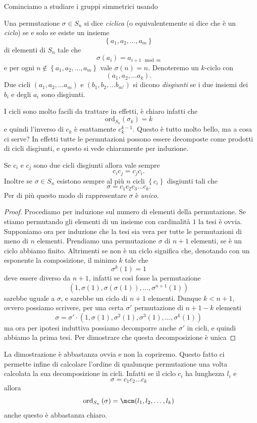 \documentclass[11pt]{scrartcl}
\newcommand{\ordine}[2]{\text{ord}_{#1}\left(#2\right)}
\begin{document}
	Cominciamo a studiare i gruppi simmetrici usando
	\begin{definition}
		Una permutazione $\sigma\in S_n$ si dice \textit{ciclica} (o equivalentemente si dice che è un \textit{ciclo}) se e solo se esiste un insieme 
		$$\left\{a_1,a_2,\dots,a_m\right\}$$
		di elementi di $S_n$ tale che 
		$$\sigma(a_i)=a_{i+1\mod m}$$
		e per ogni $n\not\in \left\{a_1,a_2,\dots,a_m\right\}$ vale $\sigma(n)=n$. Denoteremo un $k$-ciclo con 
		$$(a_1, a_2, \dots a_k).$$
		Due cicli $(a_1, a_2, \dots a_m)$ e $(b_1, b_2, \dots b_{m'})$ si dicono \textit{disgiunti} se i due insiemi dei $b_i$ e degli $a_i$ sono disgiunti. 
	\end{definition}
	I cicli sono molto facili da trattare in effetti, è chiaro infatti che 
	$$\ordine{S_n}{\sigma_k}=k$$
	e quindi l'inverso di $c_k$ è esattamente $c_k^{k-1}$. Questo è tutto molto bello, ma a cosa ci serve? In effetti tutte le permutazioni possono essere decomposte come prodotti di cicli disgiunti, e questo si vede chiaramente per induzione. 
	\begin{lemma}
		Se $c_i$ e $c_j$ sono due cicli disgiunti allora vale sempre
		$$c_ic_j=c_jc_i.$$
		Inoltre se $\sigma\in S_n$ esistono sempre al più $n$ cicli $\left\{c_i\right\}$ disgiunti tali che
		$$\sigma=c_1c_2c_3\dots c_k.$$
		Per di più questo modo di rappresentare $\sigma$ è \textit{unico}.
	\end{lemma} 
	\begin{proof}
		Procediamo per induzione sul numero di elementi della permutazione. Se stiamo permutando gli elementi di un insieme con cardinalità $1$ la tesi è ovvia. Supponiamo ora per induzione che la tesi sia vera per tutte le permutazioni di meno di $n$ elementi. Prendiamo una permutazione $\sigma$ di $n+1$ elementi, se è un ciclo abbiamo finito. Altrimenti se non è un ciclo significa che, denotando con un esponente la composizione, il minimo $k$ tale che
		$$\sigma^k(1)=1$$
		deve essere diverso da $n+1$, infatti se così fosse la permutazione 
		$$\left(1,\sigma(1),\sigma(\sigma(1)),\dots,\sigma^{n+1}(1)\right)$$
		sarebbe uguale a $\sigma$, e sarebbe un ciclo di $n+1$ elementi. Dunque $k<n+1$, ovvero possiamo scrivere, per una certa $\sigma'$ permutazione di $n+1-k$ elementi
		$$\sigma=\sigma'\cdot(1,\sigma(1),\sigma^2(1),\sigma^3(1),\dots,\sigma^k(1))$$
		ma ora per ipotesi induttiva possiamo decomporre anche $\sigma'$ in cicli, e quindi abbiamo la prima tesi. Per dimostrare che questa decomposizione è unica
	\end{proof}
	La dimostrazione è abbastanza ovvia e non la copriremo. Questo fatto ci permette infine di calcolare l'ordine di qualunque permutazione una volta calcolata la sua decomposizione in cicli. Infatti se il ciclo $c_i$ ha lunghezza $l_i$ e
	$$\sigma=c_1c_2\dots c_k$$
	allora 
	$$\ordine{S_n}{\sigma}=\mcm(l_1,l_2,\dots,l_k)$$
	anche questo è abbastanza chiaro. \\
	
\end{document}
